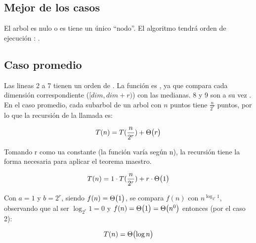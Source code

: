 \subsection{Mejor de los casos}
El arbol es nulo o es tiene un único ``nodo''.
El algoritmo tendrá orden de ejecución : .

\subsection{Caso promedio}
Las lineas 2 a 7 tienen un orden de . La función 
es , ya que compara cada dimensión correspondiente (\([dim, dim+r)\))
con las medianas. 8 y 9 son a su vez .
En el caso promedio, cada subarbol de un arbol con \(n\) puntos tiene
\(\frac{n}{2^r}\) puntos, por lo que la recursión de la llamada es:

\[ T(n) = T(\frac{n}{2^r}) + \mathrm{\Theta}\bigl(r\bigr) \]

Tomando r como ua constante (la función varía según n), la recursión
tiene la forma necesaria para aplicar el teorema maestro.

\[ T(n) = 1 \cdot T(\frac{n}{2^r}) + r \cdot \mathrm{\Theta}\bigl(1\bigr) \]

Con \(a = 1\) y \(b=2^r\), siendo \(f(n) = \mathrm{\Theta}\bigl(1\bigr)\),
se compara \(f(n)\) con \(n^{\log_{2^r}{1}}\), observando que al ser
\(\log_{2^r}{1} = 0\) y \(f(n) = \mathrm{\Theta}\bigl(1\bigr) = \mathrm{\Theta}\bigl(n^0\bigr)\) entonces (por el caso 2):

\[ T(n) = \mathrm{\Theta}\bigl(\log{n}\bigr) \]



